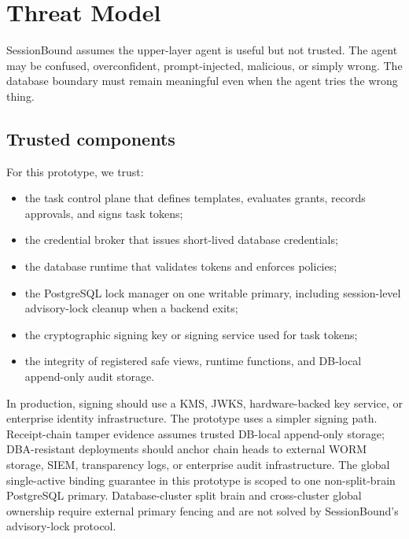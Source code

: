\documentclass[journal]{IEEEtran}
\providecommand{\tightlist}{%
  \setlength{\itemsep}{0pt}\setlength{\parskip}{0pt}}
\begin{document}
\hypertarget{threat-model}{%
\section{Threat Model}\label{threat-model}}

SessionBound assumes the upper-layer agent is useful but not trusted.
The agent may be confused, overconfident, prompt-injected, malicious, or
simply wrong. The database boundary must remain meaningful even when the
agent tries the wrong thing.

\hypertarget{trusted-components}{%
\subsection{Trusted components}\label{trusted-components}}

For this prototype, we trust:

\begin{itemize}
\tightlist
\item
  the task control plane that defines templates, evaluates grants,
  records approvals, and signs task tokens;
\item
  the credential broker that issues short-lived database credentials;
\item
  the database runtime that validates tokens and enforces policies;
\item
  the PostgreSQL lock manager on one writable primary, including
  session-level advisory-lock cleanup when a backend exits;
\item
  the cryptographic signing key or signing service used for task tokens;
\item
  the integrity of registered safe views, runtime functions, and
  DB-local append-only audit storage.
\end{itemize}

In production, signing should use a KMS, JWKS, hardware-backed key
service, or enterprise identity infrastructure. The prototype uses a
simpler signing path. Receipt-chain tamper evidence assumes trusted
DB-local append-only storage; DBA-resistant deployments should anchor
chain heads to external WORM storage, SIEM, transparency logs, or
enterprise audit infrastructure.
The global single-active binding guarantee in this prototype is scoped
to one non-split-brain PostgreSQL primary. Database-cluster split brain
and cross-cluster global ownership require external primary fencing and
are not solved by SessionBound's advisory-lock protocol.
\end{document}
